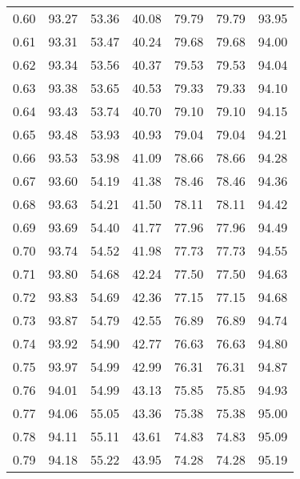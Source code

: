 \begin{tabular}{|c|c|c|c|c|c|c|}
      0.60 &     93.27 &     53.36 &      40.08 &   79.79 &      79.79 &         93.95 \\
      0.61 &     93.31 &     53.47 &      40.24 &   79.68 &      79.68 &         94.00 \\
      0.62 &     93.34 &     53.56 &      40.37 &   79.53 &      79.53 &         94.04 \\
      0.63 &     93.38 &     53.65 &      40.53 &   79.33 &      79.33 &         94.10 \\
      0.64 &     93.43 &     53.74 &      40.70 &   79.10 &      79.10 &         94.15 \\
      0.65 &     93.48 &     53.93 &      40.93 &   79.04 &      79.04 &         94.21 \\
      0.66 &     93.53 &     53.98 &      41.09 &   78.66 &      78.66 &         94.28 \\
      0.67 &     93.60 &     54.19 &      41.38 &   78.46 &      78.46 &         94.36 \\
      0.68 &     93.63 &     54.21 &      41.50 &   78.11 &      78.11 &         94.42 \\
      0.69 &     93.69 &     54.40 &      41.77 &   77.96 &      77.96 &         94.49 \\
      0.70 &     93.74 &     54.52 &      41.98 &   77.73 &      77.73 &         94.55 \\
      0.71 &     93.80 &     54.68 &      42.24 &   77.50 &      77.50 &         94.63 \\
      0.72 &     93.83 &     54.69 &      42.36 &   77.15 &      77.15 &         94.68 \\
      0.73 &     93.87 &     54.79 &      42.55 &   76.89 &      76.89 &         94.74 \\
      0.74 &     93.92 &     54.90 &      42.77 &   76.63 &      76.63 &         94.80 \\
      0.75 &     93.97 &     54.99 &      42.99 &   76.31 &      76.31 &         94.87 \\
      0.76 &     94.01 &     54.99 &      43.13 &   75.85 &      75.85 &         94.93 \\
      0.77 &     94.06 &     55.05 &      43.36 &   75.38 &      75.38 &         95.00 \\
      0.78 &     94.11 &     55.11 &      43.61 &   74.83 &      74.83 &         95.09 \\
      0.79 &     94.18 &     55.22 &      43.95 &   74.28 &      74.28 &         95.19 \\

\end{tabular}
